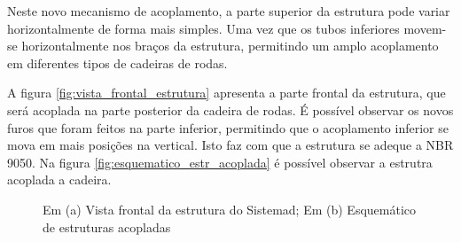 Neste novo mecanismo de acoplamento, a parte superior da estrutura pode variar horizontalmente de forma mais simples. Uma vez que os tubos inferiores movem-se horizontalmente nos braços da estrutura, permitindo um amplo acoplamento em diferentes tipos de cadeiras de rodas.

A figura \ref{fig:vista_frontal_estrutura} apresenta a parte frontal da estrutura, que será acoplada na parte posterior da cadeira de rodas. É possível observar os novos furos que foram feitos na parte inferior, permitindo que o acoplamento inferior se mova em mais posições na vertical. Isto faz com que a estrutura se adeque a NBR 9050. Na figura \ref{fig:esquematico_estr_acoplada} é possível observar a estrutra acoplada a cadeira.

\begin{figure}[!ht]
	\caption{Em (a) Vista frontal da estrutura do Sistemad; Em (b) Esquemático de estruturas acopladas}\label{fig:vista_frontal_e_esquematico_acoplamento}
\end{figure}

